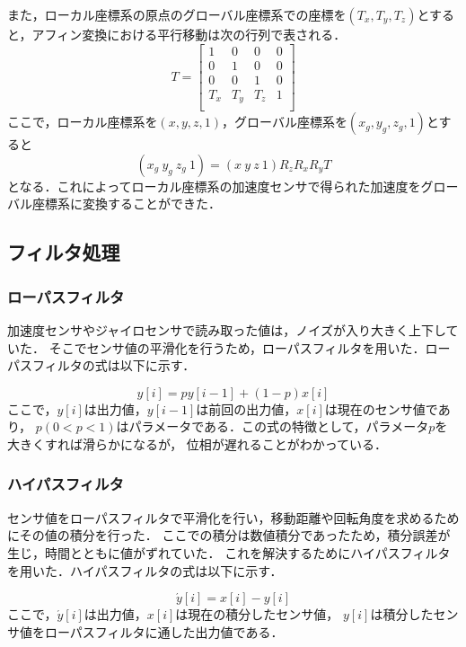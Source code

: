 \documentclass[11pt,a4]{jsarticle}
\begin{document}
   また，ローカル座標系の原点のグローバル座標系での座標を$(T_x,T_y,T_z)$とすると，アフィン変換における平行移動は次の行列で表される．
   \begin{equation}
    T = \left[
	    \begin{array}{cccc}
	      1  &  0  &  0  & 0 \\
	      0  &  1  &  0  & 0 \\
	      0  &  0  &  1  & 0 \\
             T_x & T_y & T_z & 1 \\
	    \end{array}
	   \right]
   \end{equation}
   ここで，ローカル座標系を$(x,y,z,1)$，グローバル座標系を$(x_g,y_g,z_g,1)$とすると
   \begin{equation}
    (x_g \  y_g \ z_g \ 1) = (x \ y \ z \ 1) R_z  R_x  R_y T
   \end{equation}
   となる．これによってローカル座標系の加速度センサで得られた加速度をグローバル座標系に変換することができた．

\subsection{フィルタ処理}
 \subsubsection{ローパスフィルタ}
 加速度センサやジャイロセンサで読み取った値は，ノイズが入り大きく上下していた．
そこでセンサ値の平滑化を行うため，ローパスフィルタを用いた．ローパスフィルタの式は以下に示す．

\begin{equation}
 y[i]=py[i-1]+(1-p)x[i]
 \label{low_pass}
\end{equation}
ここで，$y[i]$は出力値，$y[i-1]$は前回の出力値，$x[i]$は現在のセンサ値であり，
$p(0<p<1)$はパラメータである．この式の特徴として，パラメータ$p$を大きくすれば滑らかになるが，
位相が遅れることがわかっている．

   \subsubsection{ハイパスフィルタ}
センサ値をローパスフィルタで平滑化を行い，移動距離や回転角度を求めるためにその値の積分を行った．
ここでの積分は数値積分であったため，積分誤差が生じ，時間とともに値がずれていた．
これを解決するためにハイパスフィルタを用いた．ハイパスフィルタの式は以下に示す．

\begin{equation}
 \acute{y}[i]=x[i]-y[i]
 \label{high_pass}
\end{equation}
ここで，$\acute{y}[i]$は出力値，$x[i]$は現在の積分したセンサ値，
$y[i]$は積分したセンサ値をローパスフィルタに通した出力値である．
\end{document}
